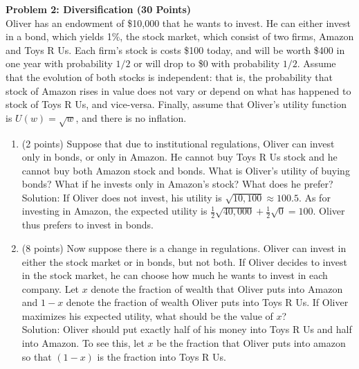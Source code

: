 \noindent\textbf{Problem 2: Diversification (30 Points)} \\
Oliver has an endowment of \$10,000 that he wants to invest. He can either invest in a bond, which yields 1\%, the stock market, which consist of two firms, Amazon and Toys R Us. Each firm’s stock is costs \$100 today, and will be worth \$400 in one year with probability $1/2$ or will drop to \$0 with probability $1/2$. Assume that the evolution of both stocks is independent: that is, the probability that stock of Amazon rises in value does not vary or depend on what has happened to stock of Toys R Us, and vice-versa. Finally, assume that Oliver’s utility function is $U(w) = \sqrt{w}$, and there is no inflation. 

\begin{enumerate}
    \item (2 points) Suppose that due to institutional regulations, Oliver can invest only in bonds, or only in Amazon. He cannot buy Toys R Us stock and he cannot buy both Amazon stock and bonds. What is Oliver’s utility of buying bonds? What if he invests only in Amazon’s stock? What does he prefer? \\
    Solution: If Oliver does not invest, his utility is $\sqrt{10,100} \approx 100.5$. As for investing in Amazon, the expected utility is $\frac{1}{2}\sqrt{40,000} + \frac{1}{2}\sqrt{0} = 100$. Oliver thus prefers to invest in bonds.
    \item (8 points) Now suppose there is a change in regulations. Oliver can invest in either the stock market or in bonds, but not both. If Oliver decides to invest in the stock market, he can choose how much he wants to invest in each company. Let $x$ denote the fraction of wealth that Oliver puts into Amazon and $1-x$ denote the fraction of wealth Oliver puts into Toys R Us. If Oliver maximizes his expected utility, what should be the value of $x$? \\
    Solution: Oliver should put exactly half of his money into Toys R Us and half into Amazon. To see this, let $x$ be the fraction that Oliver puts into amazon so that $(1 - x)$ is the fraction into Toys R Us.
\end{enumerate}
